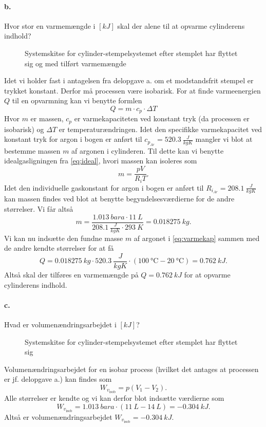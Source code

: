 \documentclass[a4paper]{article}
\begin{document}
\paragraph{b.} Hvor stor en varmemængde i $[\unit{kJ}]$ skal der alene til at opvarme cylinderens indhold?
\begin{figure}[ht]
  \centering
  \caption{Systemskitse for cylinder-stempelsystemet efter stemplet har flyttet sig og med tilført varmemængde}
  \label{fig:a2-1-2}
\end{figure}
\bigbreak
Idet vi holder fast i antagelsen fra delopgave a. om et modstandsfrit stempel er trykket konstant. Derfor må processen være isobarisk. For at finde varmeenergien $Q$ til en opvarmning kan vi benytte formlen
\begin{equation} \label{eq:varmekap}
  Q = m \cdot c_p \cdot \Delta T
\end{equation}
Hvor $m$ er massen, $c_p$ er varmekapaciteten ved konstant tryk (da processen er isobarisk) og $\Delta T$ er temperaturændringen. Idet den specifikke varmekapacitet ved konstant tryk for argon i bogen er anført til $c_{p_{Ar}} = \qty{520,3}{\frac{J}{kgK}}$ mangler vi blot at bestemme massen $m$ af argonen i cylinderen. Til dette kan vi benytte idealgasligningen fra \autoref{eq:ideal}, hvori massen kan isoleres som
\[ 
m = \frac{pV}{R_i T}
.\]
Idet den individuelle gaskonstant for argon i bogen er anført til $R_{i_{Ar}} = \qty{208,1}{\frac{J}{kgK}}$ kan massen findes ved blot at benytte begyndelsesværdierne for de andre størrelser. Vi får altså
\[ 
m = \frac{\qty{1,013}{bara} \cdot \qty{11}{L}}{\qty{208,1}{\frac{J}{kgK}} \cdot \qty{293}{K}} = \qty{0,018275}{kg}
.\]
Vi kan nu indsætte den fundne masse $m$ af argonet i \autoref{eq:varmekap} sammen med de andre kendte størrelser for at få
\[ 
Q = \qty{0,018275}{kg} \cdot \qty{520,3}{\frac{J}{kg K} \cdot (\qty{100}{\celsius} - \qty{20}{\celsius})} = \qty{0,762}{kJ}
.\]
Altså skal der tilføres en varmemængde på \underline{\underline{$Q = \qty{0,762}{kJ}$}} for at opvarme cylinderens indhold.


\paragraph{c.} Hvad er volumenændringsarbejdet i $[\unit{kJ}]$? 
\bigbreak
\begin{figure}[ht]
  \centering
  \caption{Systemskitse for cylinder-stempelsystemet efter stemplet har flyttet sig}
  \label{fig:a2-1-1}
\end{figure}
Volumenændringsarbejdet for en isobar process (hvilket det antages at processen er jf. delopgave a.) kan findes som
\[ 
W_{v_{\text{isob}}} = p \left( V_1 - V_2 \right)
.\]
Alle størrelser er kendte og vi kan derfor blot indsætte værdierne som
\[ 
W_{v_{\text{isob}}} = \qty{1,013}{bara} \cdot \left( \qty{11}{L} - \qty{14}{L}  \right) = - \qty{0,304}{kJ} 
.\]
Altså er volumenændringsarbejdet \underline{\underline{$W_{v_{\text{isob}}} = -\qty{0,304}{kJ}$}}.
\end{document}
